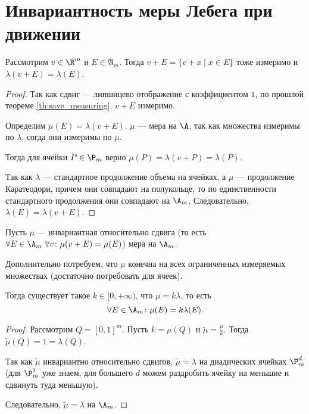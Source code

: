\section{Инвариантность меры Лебега при движении}
\begin{thm}
	Рассмотрим $ v \in  \R^{m} $ и $ E \in \mathfrak{A}_{m}$. Тогда
	$ v + E = \{v + x \mid x \in E\}$ тоже измеримо и $ \lambda (v + E) = \lambda (E)$.
\end{thm}
\begin{proof}
	Так как сдвиг --- липшицево отображение с коэффициентом $ 1$, по прошлой теореме \ref{th:save_measuring},  $ v + E$ измеримо.

	Определим $ \mu(E) = \lambda (v + E)$. $ \mu$ --- мера на $ \A$, так как множества измеримы по $ \lambda $, согда они измеримы по $ \mu$.

	Тогда для ячейки $ P \in \P_m$ верно $ \mu(P) = \lambda (v + P) = \lambda (P)$.

	Так как $ \lambda $ --- стандартное продолжение объема на ячейках, а $ \mu$ --- продолжение Каратеодори, причем они совпадают на полукольце, то по единственности стандартного продолжения они совпадают на $ \A_{m}$. Следовательно, $ \lambda (E) = \lambda (v + E)$.
\end{proof}

\begin{thm}
	Пусть $ \mu$ --- инвариантная относительно сдвига (то есть $ \forall E \in \A_{m} ~ \forall v \colon \mu(v + E) = \mu(E)$) мера на  $ \A_{m}$.

	Дополнительно потребуем, что $ \mu$ конечна на всех ограниченных измеряемых множествах (достаточно потребовать для ячеек).

	Тогда существует такое $ k \in [0, +\infty)$, что $ \mu = k \lambda $, то есть 
	\[
		\forall E \in \A_m \colon \mu(E) = k \lambda (E)
	.\] 
\end{thm}
\begin{proof}
	Рассмотрим $ Q = [0, 1]^{m}$. Пусть $ k = \mu(Q)$ и $ \widetilde{ \mu} = \frac{\mu}{k}$.
	Тогда $ \widetilde{ \mu} (Q) = 1 = \lambda (Q)$. 

	Так как $ \widetilde{ \mu} $ инвариантно относительно сдвигов, $ \widetilde{ \mu}  = \lambda $ на диадических ячейках $ \P_{m}^{d}$ (для $ \P_{m}^{1}$ уже знаем, для большего $ d$ можем раздробить ячейку на меньшие и сдвинуть туда меньшую).

	Следовательно, $ \widetilde{ \mu}  = \lambda $ на $ \A_m$.
\end{proof}

